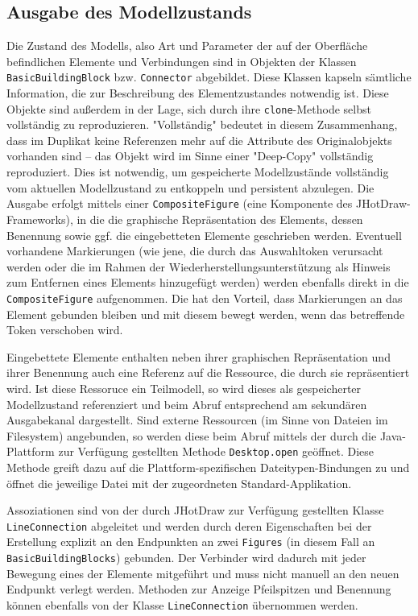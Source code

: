 \subsection{Ausgabe des Modellzustands} %
\label{sub:einsatz_von_jhotdraw}

Die Zustand des Modells, also Art und Parameter der auf der Oberfläche befindlichen Elemente und Verbindungen sind in Objekten der Klassen \texttt{BasicBuildingBlock} bzw. \texttt{Connector} abgebildet. Diese Klassen kapseln sämtliche Information, die zur Beschreibung des Elementzustandes notwendig ist. Diese Objekte sind außerdem in der Lage, sich durch ihre \texttt{clone}-Methode selbst vollständig zu reproduzieren. "Vollständig" bedeutet in diesem Zusammenhang, dass im Duplikat keine Referenzen mehr auf die Attribute des Originalobjekts vorhanden sind -- das Objekt wird im Sinne einer "Deep-Copy" vollständig reproduziert. Dies ist notwendig, um gespeicherte Modellzustände vollständig vom aktuellen Modellzustand zu entkoppeln und persistent abzulegen. Die Ausgabe erfolgt mittels einer \texttt{CompositeFigure} (eine Komponente des JHotDraw-Frameworks), in die die graphische Repräsentation des Elements, dessen Benennung sowie ggf. die eingebetteten Elemente geschrieben werden. Eventuell vorhandene Markierungen (wie jene, die durch das Auswahltoken verursacht werden oder die im Rahmen der Wiederherstellungsunterstützung als Hinweis zum Entfernen eines Elements hinzugefügt werden) werden ebenfalls direkt in die \texttt{CompositeFigure} aufgenommen. Die hat den Vorteil, dass Markierungen an das Element gebunden bleiben und mit diesem bewegt werden, wenn das betreffende Token verschoben wird.

Eingebettete Elemente enthalten neben ihrer graphischen Repräsentation und ihrer Benennung auch eine Referenz auf die Ressource, die durch sie repräsentiert wird. Ist diese Ressoruce ein Teilmodell, so wird dieses als gespeicherter Modellzustand referenziert und beim Abruf entsprechend am sekundären Ausgabekanal dargestellt. Sind externe Ressourcen (im Sinne von Dateien im Filesystem) angebunden, so werden diese beim Abruf mittels der durch die Java-Plattform zur Verfügung gestellten Methode \texttt{Desktop.open} geöffnet. Diese Methode greift dazu auf die Plattform-spezifischen Dateitypen-Bindungen zu und öffnet die jeweilige Datei mit der zugeordneten Standard-Applikation. 

Assoziationen sind von der durch JHotDraw zur Verfügung gestellten Klasse \texttt{LineConnection} abgeleitet und werden durch deren Eigenschaften bei der Erstellung explizit an den Endpunkten an zwei \texttt{Figures} (in diesem Fall an \texttt{BasicBuildingBlocks}) gebunden. Der Verbinder wird dadurch mit jeder Bewegung eines der Elemente mitgeführt und muss nicht manuell an den neuen Endpunkt verlegt werden. Methoden zur Anzeige Pfeilspitzen und Benennung können ebenfalls von der Klasse \texttt{LineConnection} übernommen werden.

